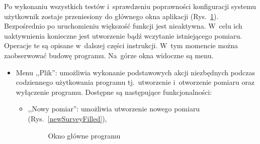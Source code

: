 \noindent Po wykonaniu wszystkich testów i~sprawdzeniu poprawności konfiguracji systemu użytkownik zostaje przeniesiony do głównego okna aplikacji (Rys.~\ref{main}). Bezpośrednio po uruchomieniu większość funkcji jest nieaktywna. W~celu ich uaktywnienia konieczne jest utworzenie bądź wczytanie istniejącego pomiaru. Operacje te są opisane w~dalszej części instrukcji. W~tym momencie można zaobserwować budowę programu. Na~górze okna widoczne są menu.
\begin{itemize}
\item Menu ,,Plik'': umożliwia wykonanie podstawowych akcji niezbędnych podczas codziennego użytkowania programu tj.~utworzenie i~otworzenie pomiaru oraz wyłączenie programu. Dostępne są następujące funkcjonalności:
\begin{itemize}
\item ,,Nowy pomiar'': umożliwia utworzenie nowego pomiaru (Rys.~\ref{newSurveyFilled}),

\begin{figure}[!htb]
\centering 		
  \hspace{1mm}
\caption{Okno główne programu} 	
\label{main}
\end{figure}


\end{itemize}
\end{itemize}
